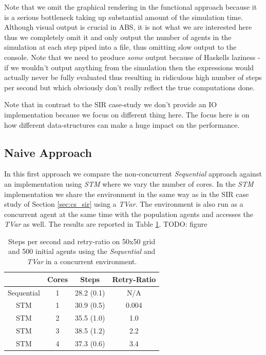 Note that we omit the graphical rendering in the functional approach because it is a serious bottleneck taking up substantial amount of the simulation time. Although visual output is crucial in ABS, it is not what we are interested here thus we completely omit it and only output the number of agents in the simulation at each step piped into a file, thus omitting slow output to the console. Note that we need to produce \textit{some} output because of Haskells laziness - if we wouldn't output anything from the simulation then the expressions would actually never be fully evaluated thus resulting in ridiculous high number of steps per second but which obviously don't really reflect the true computations done.

Note that in contrast to the SIR case-study we don't provide an IO implementation because we focus on different thing here. The focus here is on how different data-structures can make a huge impact on the performance.

\subsection{Naive Approach}
In this first approach we compare the non-concurrent \textit{Sequential} approach against an implementation using \textit{STM} where we vary the number of cores. In the \textit{STM} implementation we share the environment in the same way as in the SIR case study of Section \ref{sec:cs_sir} using a \textit{TVar}. The environment is also run as a concurrent agent at the same time with the population agents and accesses the \textit{TVar} as well. The results are reported in Table \ref{tab:naive_results_time}. TODO: figure

\begin{table}
	\centering
  	\begin{tabular}{ c || c | c | c }
                   & Cores & Steps          & Retry-Ratio   \\ \hline \hline 
    	Sequential & 1     & 28.2 (0.1) & N/A 				\\ \hline \hline
   		STM        & 1     & 30.9 (0.5) & 0.004 			\\ \hline
   		STM        & 2     & 35.5 (1.0) & 1.0 				\\ \hline
   		STM        & 3     & 38.5 (1.2) & 2.2 				\\ \hline
   		STM        & 4     & 37.3 (0.6) & 3.4
   	\end{tabular}
  	
  	\caption{Steps per second and retry-ratio on 50x50 grid and 500 initial agents using the \textit{Sequential} and \textit{TVar} in a concurrent environment.}
	\label{tab:naive_results_time}
\end{table}


